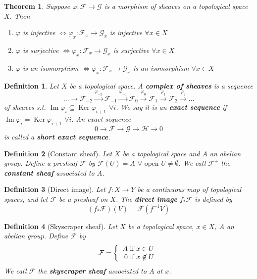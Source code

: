 \documentclass[a4paper]{article}
\newtheorem*{definition}{Definition}
\newtheorem{theorem}{Theorem}
\DeclareMathOperator{\Ima}{Im}
\DeclareMathOperator{\Ker}{Ker}
\begin{document}
\begin{theorem}
	Suppose $\varphi:\mathcal{F}\to\mathcal{G}$ is a morphism of sheaves on a topological space $X$. Then
	\begin{enumerate}[label=\roman*.]
		\item $\varphi$ is injective $\iff \varphi_x:\mathcal{F}_x\to\mathcal{G}_x$ is injective $\forall x \in X$
		\item $\varphi$ is surjective $\iff \varphi_x:\mathcal{F}_x\to\mathcal{G}_x$ is surjective $\forall x \in X$
		\item $\varphi$ is an isomorphism $\iff \varphi_x:\mathcal{F}_x\to\mathcal{G}_x$ is an isomorphism $\forall x \in X$
	\end{enumerate}
\end{theorem}

\begin{definition}
	Let $X$ be a topological space. A \textbf{complex of sheaves} is a sequence
	$$\dots \to \mathcal{F}_{-2} \overset{\varphi_{-2}}{\to} \mathcal{F}_{-1} \overset{\varphi_{-1}}{\to} \mathcal{F}_0 \overset{\varphi_0}{\to} \mathcal{F}_1 \overset{\varphi_1}{\to} \mathcal{F}_2 \overset{\varphi_2}{\to} \dots$$
	of sheaves s.t. $\Ima \varphi_i \subseteq \Ker \varphi_{i+1}$ $\forall i$. We say it is an \textbf{exact sequence} if $\Ima \varphi_i = \Ker\varphi_{i+1}$ $\forall i$. An exact sequence
	$$0 \to \mathcal{F} \to \mathcal{G} \to \mathcal{H} \to 0$$
	is called a \textbf{short exact sequence}.
\end{definition}

\begin{definition}[Constant sheaf]
	Let $X$ be a topological space and $A$ an abelian group. Define a presheaf $\mathcal{F}$ by $\mathcal{F}(U)=A$ $\forall \text{ open } U \neq \emptyset$. We call $\mathcal{F}^+$ the \textbf{constant sheaf} associated to $A$.
\end{definition}

\begin{definition}[Direct image]
	Let $f:X\to Y$ be a continuous map of topological spaces, and let $\mathcal{F}$ be a presheaf on $X$. The \textbf{direct image} $f_*\mathcal{F}$ is defined by $$(f_*\mathcal{F})(V) = \mathcal{F}(f^{-1}V)$$
\end{definition}

\begin{definition}[Skyscraper sheaf]
	Let $X$ be a topological space, $x \in X$, $A$ an abelian group. Define $\mathcal{F}$ by \[\mathcal{F} = \left\{
	\begin{tabular}{r}
	$A$ if $x \in U$\\$0$ if $x \not\in U$
	\end{tabular}\right.
	\]
	We call $\mathcal{F}$ the \textbf{skyscraper sheaf} associated to $A$ at $x$.
\end{definition}
\end{document}
